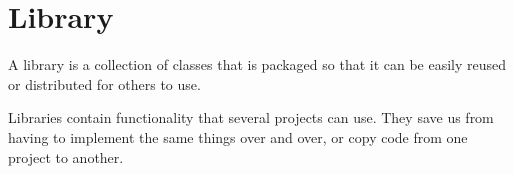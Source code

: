 \section{Library}

A library is a collection of classes that is packaged so that it can be easily reused or distributed for others to use.

Libraries contain functionality that several projects can use. They save us from having to implement the same things over and over, or copy code from one project to another.





